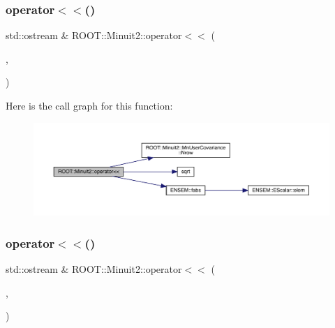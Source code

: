 \subsubsection{\texorpdfstring{operator$<$$<$()}{operator<<()}\hspace{0.1cm}{\footnotesize\ttfamily [6/11]}}
{\footnotesize\ttfamily std\+::ostream \& R\+O\+O\+T\+::\+Minuit2\+::operator$<$$<$ (\begin{DoxyParamCaption}\item[{std\+::ostream \&}]{,  }\item[{const \mbox{\hyperlink{classROOT_1_1Minuit2_1_1MnUserCovariance}{Mn\+User\+Covariance}} \&}]{ }\end{DoxyParamCaption})}

Here is the call graph for this function\+:\nopagebreak
\begin{figure}[H]
\begin{center}
\leavevmode
\includegraphics[width=350pt]{d6/d3a/namespaceROOT_1_1Minuit2_ab0d367617b39c46b8b0eeef75ecc5b75_cgraph}
\end{center}
\end{figure}
\mbox{\label{namespaceROOT_1_1Minuit2_ad8fa7aff1b1b2645f8b2a9c9a2231252}} 
\subsubsection{\texorpdfstring{operator$<$$<$()}{operator<<()}\hspace{0.1cm}{\footnotesize\ttfamily [7/11]}}
{\footnotesize\ttfamily std\+::ostream \& R\+O\+O\+T\+::\+Minuit2\+::operator$<$$<$ (\begin{DoxyParamCaption}\item[{std\+::ostream \&}]{,  }\item[{const \mbox{\hyperlink{classROOT_1_1Minuit2_1_1MnGlobalCorrelationCoeff}{Mn\+Global\+Correlation\+Coeff}} \&}]{ }\end{DoxyParamCaption})}

